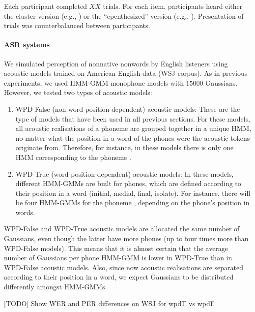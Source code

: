 {Each participant completed {\color{red}$XX$} trials. For each item, participants heard either the cluster version (e.g., ) or the ``epenthesized'' version (e.g., ). Presentation of trials was counterbalanced between participants.   


\paragraph{ASR systems}
We simulated perception of nonnative nonwords by English listeners using acoustic models trained on American English data (WSJ corpus). As in previous experiments, we used HMM-GMM monophone models with $15000$ Gaussians. However, we tested two types of acoustic models:

\begin{enumerate}
\item WPD-False (non-word position-dependent) acoustic models: These are the type of models that have been used in all previous sections. For these models, all acoustic realisations of a phoneme are grouped together in a unique HMM, no matter what the position in a word of the phones were the acoustic tokens originate from. Therefore, for instance, in these models there is only one HMM corresponding to the phoneme .
  \item WPD-True (word position-dependent) acoustic models: In these models, different HMM-GMMs are built for phones, which are defined according to their position in a word (initial, medial, final, isolate). For instance, there will be four HMM-GMMs for the phoneme , depending on the phone's position in words.  
\end{enumerate}

WPD-False and WPD-True acoustic models are allocated the same number of Gaussians, even though the latter have more phones (up to four times more than WPD-False models). This means that it is almost certain that the average number of Gaussians per phone HMM-GMM is lower in WPD-True than in WPD-False acoustic models. Also, since now acoustic realisations are separated according to their position in a word, we expect Gaussians to be distributed differently amongst HMM-GMMs.

{\color{red}[TODO] Show WER and PER differences on WSJ for wpdT vs wpdF}

}
